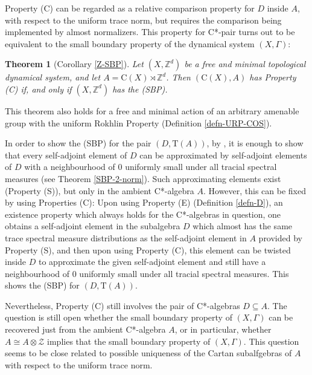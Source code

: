 \documentclass[12pt, oneside, psamsfonts]{amsart}
\newtheorem{thm}{Theorem}[section]
\theoremstyle{definition}
\theoremstyle{remark}
\numberwithin{equation}{section}
\newcommand{\Int}{\mathbb Z}
\newcommand{\tr}{\mathrm{T}}
\begin{document}
Property (C) can be regarded as a relative comparison property for $D$ inside $A$, with respect to the uniform trace norm, but requires the comparison being implemented by almost normalizers. This property for C*-pair turns out to be equivalent to the small boundary property of the dynamical system $(X, \Gamma)$: 


\begin{thm}[Corollary \ref{Z-SBP}]
Let $(X, \Int^d)$ be a free and minimal topological dynamical system, and let $A = \mathrm{C}(X)\rtimes \Int^d$. Then $(\mathrm{C}(X), A)$ has Property (C) if, and only if $(X, \Int^d)$ has the (SBP). %
\end{thm}


This theorem also holds for a free and minimal action of an arbitrary  amenable group with the uniform Rokhlin Property (Definition \ref{defn-URP-COS}). %


In order to show the (SBP) for the pair $(D, \tr(A))$, by \cite{EN-SBP-I}, it is enough to show that every self-adjoint element of $D$ can be approximated by self-adjoint elements of $D$ with a neighbourhood of $0$ uniformly small under all tracial spectral measures (see Theorem \ref{SBP-2-norm}). Such approximating elements exist (Property (S)), but only in the ambient C*-algebra $A$. However, this can be fixed by using Properties (C): Upon using  Property (E) (Definition \ref{defn-D}), an existence property which always holds for the C*-algebras in question, one obtains a self-adjoint element in the subalgebra $D$ which almost has the same trace spectral measure distributions as the self-adjoint element in $A$ provided by Property (S), and then upon using Property (C), this element can be twisted inside $D$ to approximate the given self-adjoint element and still have a neighbourhood of $0$ uniformly small under all tracial spectral measures. This shows the (SBP) for $(D, \tr(A))$.

Nevertheless, Property (C) still involves the pair of C*-algebras $D \subseteq A$. The question is still open whether the small boundary property of $(X, \Gamma)$ can be recovered just from the ambient C*-algebra $A$, or in particular, whether $A \cong A\otimes \mathcal Z$ implies that the small boundary property of $(X, \Gamma)$. This question seems to be close related to  possible uniqueness of the Cartan subalfgebras of $A$ with respect to the uniform trace norm. 
\end{document}

